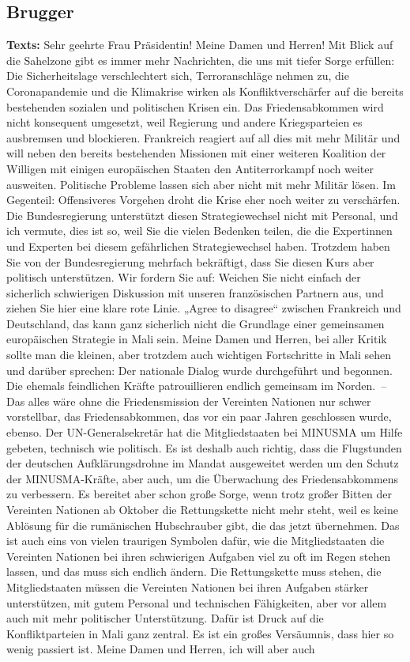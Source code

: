 \documentclass{article}
\begin{document}
\subsection{Brugger}
\noindent\textbf{Texts:} Sehr geehrte Frau Präsidentin! Meine Damen und Herren! Mit Blick auf die Sahelzone gibt es immer mehr Nachrichten, die uns mit tiefer Sorge erfüllen: Die Sicherheitslage verschlechtert sich, Terroranschläge nehmen zu, die Coronapandemie und die Klimakrise wirken als Konfliktverschärfer auf die bereits bestehenden sozialen und politischen Krisen ein. Das Friedensabkommen wird nicht konsequent umgesetzt, weil Regierung und andere Kriegsparteien es ausbremsen und blockieren. Frankreich reagiert auf all dies mit mehr Militär und will neben den bereits bestehenden Missionen mit einer weiteren Koalition der Willigen mit einigen europäischen Staaten den Antiterrorkampf noch weiter ausweiten. Politische Probleme lassen sich aber nicht mit mehr Militär lösen. Im Gegenteil: Offensiveres Vorgehen droht die Krise eher noch weiter zu verschärfen.  Die Bundesregierung unterstützt diesen Strategiewechsel nicht mit Personal, und ich vermute, dies ist so, weil Sie die vielen Bedenken teilen, die die Expertinnen und Experten bei diesem gefährlichen Strategiewechsel haben. Trotzdem haben Sie von der Bundesregierung mehrfach bekräftigt, dass Sie diesen Kurs aber politisch unterstützen. Wir fordern Sie auf: Weichen Sie nicht einfach der sicherlich schwierigen Diskussion mit unseren französischen Partnern aus, und ziehen Sie hier eine klare rote Linie.  „Agree to disagree“ zwischen Frankreich und Deutschland, das kann ganz sicherlich nicht die Grundlage einer gemeinsamen europäischen Strategie in Mali sein. Meine Damen und Herren, bei aller Kritik sollte man die kleinen, aber trotzdem auch wichtigen Fortschritte in Mali sehen und darüber sprechen: Der nationale Dialog wurde durchgeführt und begonnen. Die ehemals feindlichen Kräfte patrouillieren endlich gemeinsam im Norden. – Das alles wäre ohne die Friedensmission der Vereinten Nationen nur schwer vorstellbar, das Friedensabkommen, das vor ein paar Jahren geschlossen wurde, ebenso. Der UN-Generalsekretär hat die Mitgliedstaaten bei MINUSMA um Hilfe gebeten, technisch wie politisch. Es ist deshalb auch richtig, dass die Flugstunden der deutschen Aufklärungsdrohne im Mandat ausgeweitet werden um den Schutz der MINUSMA-Kräfte, aber auch, um die Überwachung des Friedensabkommens zu verbessern. Es bereitet aber schon große Sorge, wenn trotz großer Bitten der Vereinten Nationen ab Oktober die Rettungskette nicht mehr steht, weil es keine Ablösung für die rumänischen Hubschrauber gibt, die das jetzt übernehmen. Das ist auch eins von vielen traurigen Symbolen dafür, wie die Mitgliedstaaten die Vereinten Nationen bei ihren schwierigen Aufgaben viel zu oft im Regen stehen lassen, und das muss sich endlich ändern.  Die Rettungskette muss stehen, die Mitgliedstaaten müssen die Vereinten Nationen bei ihren Aufgaben stärker unterstützen, mit gutem Personal und technischen Fähigkeiten, aber vor allem auch mit mehr politischer Unterstützung. Dafür ist Druck auf die Konfliktparteien in Mali ganz zentral. Es ist ein großes Versäumnis, dass hier so wenig passiert ist. Meine Damen und Herren, ich will aber auch 
\end{document}

